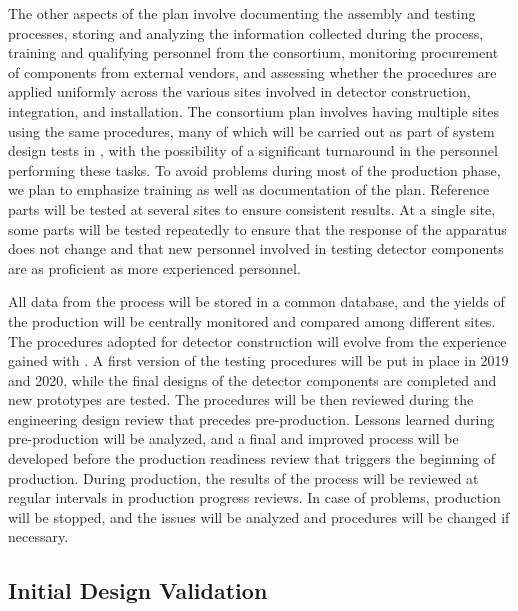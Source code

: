 The other aspects of the  plan involve documenting the 
assembly and testing processes, storing and analyzing the information
collected during the  process, training and qualifying 
personnel from the consortium, monitoring procurement of 
components from external vendors, and assessing whether the
 procedures are applied uniformly across
the various sites involved in detector construction, integration,
and installation. The  consortium plan involves
having multiple sites using the same  procedures,
many of which will be carried out as part of system design tests in ,
with the possibility of a significant turnaround in the personnel
performing these tasks. To avoid problems during most of the
production phase, we plan to emphasize training as well as documentation
of the  plan. Reference parts will be tested at
several sites to ensure consistent results. At
a single site, some parts will be tested repeatedly to ensure
that the response of the apparatus does not change and
that new personnel involved in testing detector components are 
as proficient as more experienced personnel. 

All data from
the  process will be stored in a common database, and
the yields of the production will be centrally monitored and 
compared among different sites. The procedures adopted
for detector construction will evolve from the experience
gained with . A first version of the testing procedures
will be put in place in 2019 and 2020, while the final designs of
the detector components are completed and new prototypes are
tested. The  procedures will be then reviewed
during the engineering design review that precedes pre-production. Lessons learned during pre-production
will be analyzed, and a final and improved  process will be 
developed before the production readiness review that triggers
the beginning of production. During production, the results
of the  process will be reviewed at regular intervals
in production progress reviews. In case of problems, production
will be stopped, and the issues will be analyzed 
and procedures will be changed if necessary.

\subsection{Initial Design Validation}
\label{sec:fdsp-tpcelec-qa-initial}

